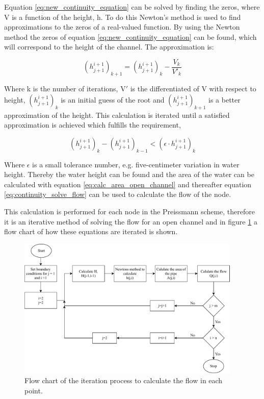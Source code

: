 Equation \ref{eq:new_continuity_equation} can be solved by finding the zeros, where V is a function of the height, h. To do this Newton's method is used to find approximations to the zeros of a real-valued function. By using the Newton method the zeros of equation \ref{eq:new_continuity_equation} can be found, which will correspond to the height of the channel. The approximation is:

\begin{equation}
     (h_{j+1}^{i+1})_{k+1} =(h_{j+1}^{i+1})_{k} - \frac{V_k}{V'_k}
\end{equation}

Where k is the number of iterations, V$'$ is the differentiated of V with respect to height, $(h_{j+1}^{i+1})_{k}$ is an initial guess of the root and $(h_{j+1}^{i+1})_{k+1}$ is a better approximation of the height. This calculation is iterated until a satisfied approximation is achieved which fulfills the requirement,

\begin{equation}
    \left(h_{j+1}^{i+1}\right)_{k}-(h_{j+1}^{i+1})_{k-1} < (\epsilon \cdot h_{j+1}^{i+1})_{k}
\end{equation}

Where $\epsilon$ is a small tolerance number, e.g. five-centimeter variation in water height. Thereby the water height can be found and the area of the water can be calculated with equation \ref{eq:calc_area_open_channel}  and thereafter equation \ref{eq:continuity_solve_flow} can be used to calculate the flow of the node.

This calculation is performed for each node in the Preissmann scheme, therefore it is an iterative method of solving the flow for an open channel and in figure \ref{fig:flow_chart_iteration} a flow chart of how these equations are iterated is shown.
\begin{figure}[H]
    \centering
    \includegraphics[width=0.95\textwidth]{report/simulation/pictures/flow_chart_iteration.pdf}
    \caption{Flow chart of the iteration process to calculate the flow in each point.}
    \label{fig:flow_chart_iteration}
\end{figure}

